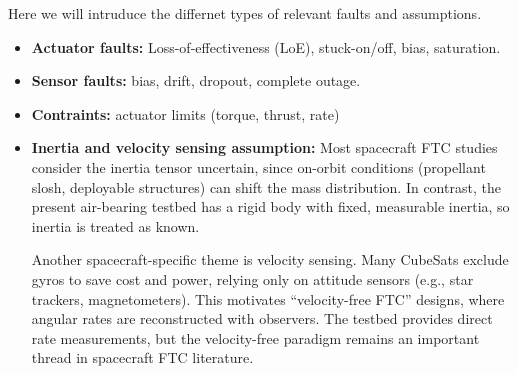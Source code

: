 Here we will intruduce the differnet types of relevant faults and assumptions.
\begin{itemize}
    \item \textbf{Actuator faults:} Loss-of-effectiveness (LoE), stuck-on/off, bias, saturation.

    \item \textbf{Sensor faults:} bias, drift, dropout, complete outage.

    \item \textbf{Contraints:} actuator limits (torque, thrust, rate)

    \item \textbf{Inertia and velocity sensing assumption:} Most spacecraft FTC studies consider the inertia tensor uncertain, since on-orbit conditions (propellant slosh, deployable structures) can shift the mass distribution. In contrast, the present air-bearing testbed has a rigid body with fixed, measurable inertia, so inertia is treated as known.

Another spacecraft-specific theme is velocity sensing. Many CubeSats exclude gyros to save cost and power, relying only on attitude sensors (e.g., star trackers, magnetometers). This motivates “velocity-free FTC” designs, where angular rates are reconstructed with observers. The testbed provides direct rate measurements, but the velocity-free paradigm remains an important thread in spacecraft FTC literature.
\end{itemize}


